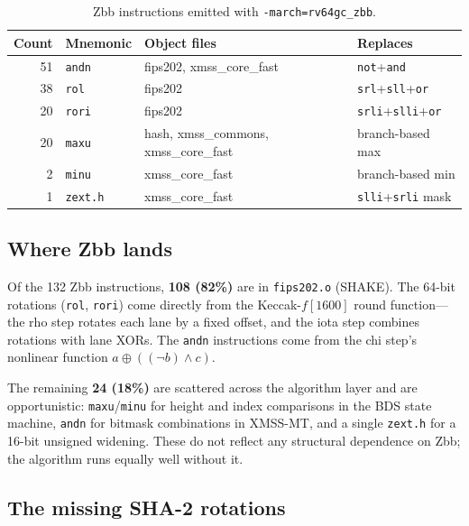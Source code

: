 \documentclass[11pt,a4paper]{article}
\begin{document}
\begin{table}[ht]
\centering
\caption{Zbb instructions emitted with \texttt{-march=rv64gc\_zbb}.}
\label{tab:zbb-detail}
\begin{tabular}{@{}rlll@{}}
\toprule
Count & Mnemonic & Object files & Replaces \\
\midrule
 51 & \texttt{andn}   & fips202, xmss\_core\_fast     & \texttt{not}+\texttt{and} \\
 38 & \texttt{rol}    & fips202                       & \texttt{srl}+\texttt{sll}+\texttt{or} \\
 20 & \texttt{rori}   & fips202                       & \texttt{srli}+\texttt{slli}+\texttt{or} \\
 20 & \texttt{maxu}   & hash, xmss\_commons, xmss\_core\_fast & branch-based max \\
  2 & \texttt{minu}   & xmss\_core\_fast              & branch-based min \\
  1 & \texttt{zext.h} & xmss\_core\_fast              & \texttt{slli}+\texttt{srli} mask \\
\bottomrule
\end{tabular}
\end{table}

\subsection{Where Zbb lands}

Of the 132 Zbb instructions, \textbf{108 (82\%)} are in
\texttt{fips202.o} (SHAKE).  The 64-bit rotations (\texttt{rol},
\texttt{rori}) come directly from the Keccak-$f[1600]$ round
function---the rho step rotates each lane by a fixed offset, and
the iota step combines rotations with lane XORs.  The \texttt{andn}
instructions come from the chi step's nonlinear function
$a \oplus ((\lnot b) \land c)$.

The remaining \textbf{24 (18\%)} are scattered across the algorithm
layer and are opportunistic: \texttt{maxu}/\texttt{minu} for height
and index comparisons in the BDS state machine, \texttt{andn} for
bitmask combinations in XMSS-MT, and a single \texttt{zext.h} for a
16-bit unsigned widening.  These do not reflect any structural
dependence on Zbb; the algorithm runs equally well without it.

\subsection{The missing SHA-2 rotations}
\end{document}
